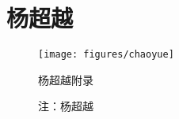 \ifx\mainpage\undefined
\def\app1{app1}

\else
\graphicspath{{./chapters/}}
\glsresetall
\fi

\chapter{杨超越}

\begin{figure}[htb]
\centering
\texttt{[image: figures/chaoyue]}
\caption[杨超越附录]{杨超越附录}
\caption*{注：杨超越}
\label{app1:fig:chaoyue}
\end{figure}


\ifx\mainpage\undefined

\fi